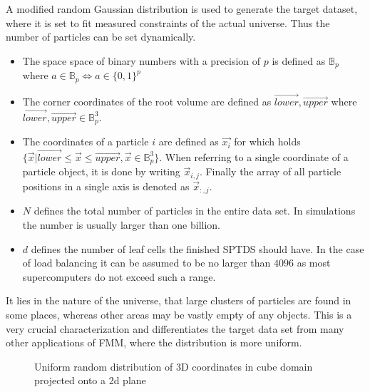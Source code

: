 \documentclass[]{article}
\begin{document}
A modified random Gaussian distribution is used to generate the target dataset, where it is set to fit measured constraints of the actual universe. Thus the number of particles can be set dynamically. 

\begin{itemize}
	\item The space space of binary numbers with a precision of $p$ is defined as $\mathbb{B}_p$ where $a \in \mathbb{B}_p \Leftrightarrow a \in \{0,1\}^{p}$
	\item The corner coordinates of the root volume are defined as $\vec{lower}, \vec{upper}$ where $\vec{lower}, \vec{upper} \in \mathbb{B}_p^3$. 
	\item The coordinates of a particle $i$ are defined as $\vec{x_i}$ for which holds $\{\vec{x} | \vec{lower} \leq \vec{x} \leq \vec{upper}, \vec{x} \in \mathbb{B}_p^3 \}$.
	When referring to a single coordinate of a particle object, it is done by writing $\vec{x}_{i,j}$. Finally the array of all particle positions in a single axis is denoted as $\vec{x}_{:,j}$. 
	\item $N$ defines the total number of particles in the entire data set. In simulations the number is usually larger than one billion. 
	\item $d$ defines the number of leaf cells the finished SPTDS should have. In the case of load balancing it can be assumed to be no larger than $4096$ as most supercomputers do not exceed such a range.
\end{itemize}

It lies in the nature of the universe, that large clusters of particles are found in some places, whereas other areas may be vastly empty of any objects. This is a very crucial characterization and differentiates the target data set from many other applications of FMM, where the distribution is more uniform.

\begin{figure}[H]
	\begin{center}
	\end{center}
	\caption{Uniform random distribution of 3D coordinates in cube domain projected onto a 2d plane}
\end{figure}
\end{document}
